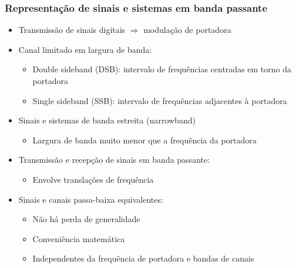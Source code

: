 \begin{frame}
	\frametitle{Representação de sinais e sistemas em banda passante}

	\begin{itemize}
	 \item Transmissão de sinais digitais $\Rightarrow$ modulação de portadora
	 \item Canal limitado em largura de banda: 
	\begin{itemize}
	 \item Double sideband (DSB): intervalo de frequências centradas em torno da portadora
	 \item Single sideband (SSB): intervalo de frequências adjacentes à portadora
	 \end{itemize}
	\item Sinais e sistemas de banda estreita (narrowband)
	\begin{itemize}
	 \item Largura de banda muito menor que a frequência da portadora
	 \end{itemize}
	  \item Transmissão e recepção de sinais em banda passante:
	\begin{itemize}
	 \item Envolve translações de frequência
	 \end{itemize}
	 \item Sinais e canais passa-baixa equivalentes:
	\begin{itemize}
	 \item Não há perda de generalidade
	  \item Conveniência matemática
	  \item Independentes da frequência de portadora e bandas de canais
	 \end{itemize}
	\end{itemize}

\end{frame}

